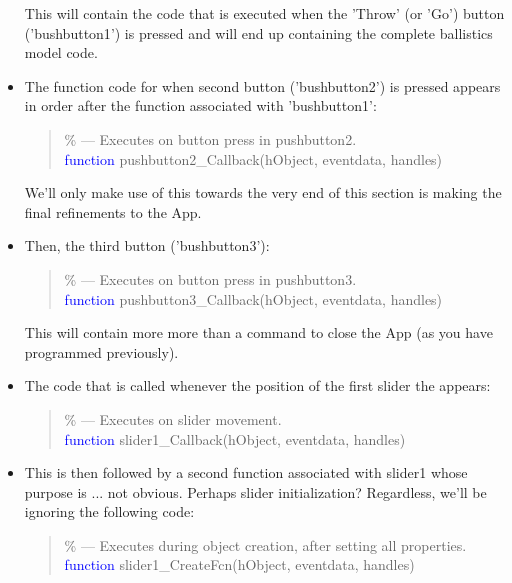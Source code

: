 \documentclass{tufte-book} %
\newenvironment{docspec}{\begin{quotation}\ttfamily\parskip0pt\parindent0pt\ignorespaces}{\end{quotation}}
\begin{document}
\begin{itemize}[noitemsep]
\begin{docspec}
\end{docspec} 
This will contain the code that is executed when the 'Throw' (or 'Go') button ('\textsf{bushbutton1}') is pressed and will end up containing the complete ballistics model code.
\vspace{1mm}
\item The function code for when second button ('\textsf{bushbutton2}') is pressed appears in order after the function associated with '\textsf{bushbutton1}':
\begin{docspec}
\textcolor[rgb]{0,0.501961,0}{\% --- Executes on button press in pushbutton2.}
\\\textcolor{blue}{function} pushbutton2\_Callback(hObject, eventdata, handles)
\end{docspec} 
We'll only make use of this towards the very end of this section is making the final refinements to the App.
\vspace{1mm}
\item Then, the third button ('\textsf{bushbutton3}'):
\begin{docspec}
\textcolor[rgb]{0,0.501961,0}{\% --- Executes on button press in pushbutton3.}
\\\textcolor{blue}{function} pushbutton3\_Callback(hObject, eventdata, handles)
\end{docspec} 
This will contain more more than a command to close the App (as you have programmed previously).
\vspace{1mm}
\item The code that is called whenever the position of the first slider the appears:
\begin{docspec}
\textcolor[rgb]{0,0.501961,0}{\% --- Executes on slider movement.}
\\\textcolor{blue}{function} slider1\_Callback(hObject, eventdata, handles)
\end{docspec} 
\vspace{1mm}
\item This is then followed by a second function associated with \textsf{slider1} whose purpose is ... not obvious. Perhaps slider initialization? Regardless, we'll be ignoring the following code:
\begin{docspec}
\textcolor[rgb]{0,0.501961,0}{\% --- Executes during object creation, after setting all properties.}
\\\textcolor{blue}{function} slider1\_CreateFcn(hObject, eventdata, handles)
\end{docspec} 
\vspace{1mm}

\end{itemize}
\end{document}
